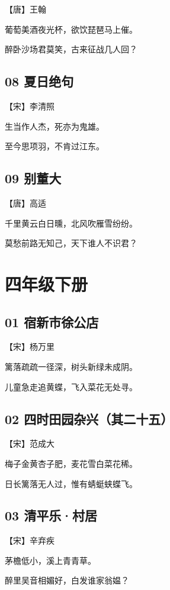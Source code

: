 \documentclass[a6paper, 12pt]{article}
\begin{document}
【唐】王翰

葡萄美酒夜光杯，欲饮琵琶马上催。

醉卧沙场君莫笑，古来征战几人回？

\subsection*{08 夏日绝句}

【宋】李清照

生当作人杰，死亦为鬼雄。

至今思项羽，不肯过江东。

\subsection*{09 别董大}

【唐】高适

千里黄云白日曛，北风吹雁雪纷纷。

莫愁前路无知己，天下谁人不识君？

\newpage

\section*{四年级下册}

\subsection*{01 宿新市徐公店}

【宋】杨万里

篱落疏疏一径深，树头新绿未成阴。

儿童急走追黄蝶，飞入菜花无处寻。

\subsection*{02 四时田园杂兴（其二十五）}

【宋】范成大

梅子金黄杏子肥，麦花雪白菜花稀。

日长篱落无人过，惟有蜻蜓蛱蝶飞。

\subsection*{03 清平乐·村居}

【宋】辛弃疾

茅檐低小，溪上青青草。

醉里吴音相媚好，白发谁家翁媪？ 
\end{document}
